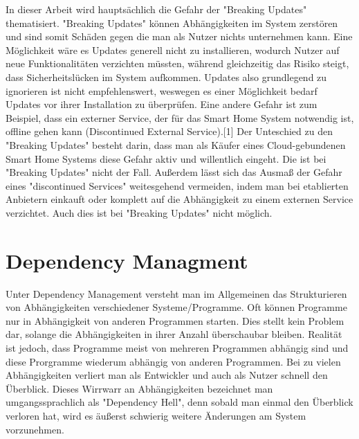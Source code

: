 In dieser Arbeit wird hauptsächlich die Gefahr der "Breaking Updates" thematisiert.
"Breaking Updates" können Abhängigkeiten im System zerstören und sind somit Schäden gegen die man als Nutzer nichts unternehmen
kann. Eine Möglichkeit wäre es Updates generell nicht zu installieren, wodurch Nutzer auf neue Funktionalitäten verzichten müssten, während gleichzeitig das Risiko steigt,
dass Sicherheitslücken im System aufkommen. Updates also grundlegend zu ignorieren ist nicht empfehlenswert, weswegen es einer Möglichkeit bedarf
Updates vor ihrer Installation zu überprüfen.
Eine andere Gefahr ist zum Beispiel, dass ein externer Service, der für das Smart Home System notwendig ist, offline gehen kann (Discontinued External Service).[1]
Der Unteschied zu den "Breaking Updates" besteht darin, dass man als Käufer eines Cloud-gebundenen Smart Home Systems diese Gefahr aktiv und willentlich eingeht.
Die ist bei "Breaking Updates" nicht der Fall.
Außerdem lässt sich das Ausmaß der Gefahr eines "discontinued Services" weitesgehend vermeiden, indem man bei etablierten Anbietern einkauft oder
komplett auf die Abhängigkeit zu einem externen Service verzichtet. Auch dies ist bei "Breaking Updates" nicht möglich.


\newpage
\section{Dependency Managment}
Unter Dependency Management versteht man im Allgemeinen das Strukturieren von Abhängigkeiten verschiedener 
Systeme/Programme. Oft können Programme nur in Abhängigkeit von anderen Programmen starten.
Dies stellt kein Problem dar, solange die Abhängigkeiten in ihrer Anzahl überschaubar bleiben. 
Realität ist jedoch, dass Programme meist von mehreren Programmen abhängig sind und diese
Prorgramme wiederum abhängig von anderen Programmen. Bei zu vielen Abhängigkeiten verliert man 
als Entwickler und auch als Nutzer schnell den Überblick. Dieses Wirrwarr an Abhängigkeiten bezeichnet man umgangssprachlich 
als "Dependency Hell", denn sobald man einmal den Überblick verloren hat, wird es äußerst schwierig weitere Änderungen am
System vorzunehmen.

